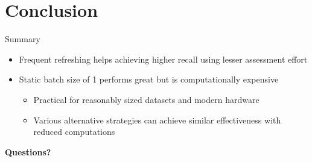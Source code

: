 \documentclass[14pt]{beamer}
\begin{document}
\section{Conclusion}
\begin{frame}{Summary}
\begin{itemize}
    \item Frequent refreshing helps achieving higher recall using lesser
       assessment effort
       \vskip 0.5cm
    \item Static batch size of 1 performs great but is computationally expensive
        \begin{itemize}
            \item Practical for reasonably sized datasets and modern hardware 
            \item Various alternative strategies can achieve similar
                effectiveness with reduced computations
        \end{itemize}
\end{itemize}
\pause
\centering
\textbf{Questions?}
\end{frame}
\end{document}
